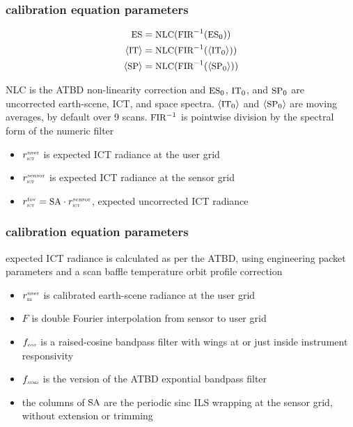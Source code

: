 \documentclass[11pt]{beamer}
\begin{document}
\begin{frame}
\frametitle{calibration equation parameters}

\vspace{-8mm}
\begin{align*}
  \mbox{\small ES} &= \mbox{\small NLC}(\mbox{\small FIR}^{-1}(\mbox{\small ES}_0)) \\
  \langle\mbox{\small IT}\rangle &= \mbox{\small NLC}(\mbox{\small FIR}^{-1}(\langle\mbox{\small IT}_0\rangle)) \\
  \langle\mbox{\small SP}\rangle &= \mbox{\small NLC}(\mbox{\small FIR}^{-1}(\langle\mbox{\small SP}_0\rangle)) \\
\end{align*}
\vspace{-8mm}

{\small NLC} is the ATBD non-linearity correction and $\mbox{\small ES}_0$,
$\mbox{\small IT}_0$, and $\mbox{\small SP}_0$ are uncorrected earth-scene, ICT, and space
spectra.  $\langle\mbox{\small IT}_0\rangle$ and $\langle\mbox{\small SP}_0\rangle$ are moving
averages, by default over 9 scans.  $\mbox{\small FIR}^{-1}$ is pointwise division
by the spectral form of the numeric filter

\begin{itemize}
  \item $r_{\mbox{\tiny\textsc{ict}}}^{\mbox{\tiny user}}$ is expected ICT radiance at the user grid
  \item $r_{\mbox{\tiny\textsc{ict}}}^{\mbox{\tiny sensor}}$ is expected ICT radiance at the sensor grid
  \item $r_{\mbox{\tiny\textsc{ict}}}^{\mbox{\tiny fov}} = \mbox{\small SA} \cdot r_{\mbox{\tiny\textsc{ict}}}^{\mbox{\tiny sensor}}$, expected uncorrected ICT
    radiance 
\end{itemize}

\end{frame}
\begin{frame}
\frametitle{calibration equation parameters}

expected ICT radiance is calculated as per the ATBD, using
engineering packet parameters and a scan baffle temperature orbit
profile correction

\begin{itemize}
  \item $r_{\mbox{\tiny\textsc{es}}}^{\mbox{\tiny user}}$ is calibrated earth-scene radiance at the user grid
  \item $F$ is double Fourier interpolation from sensor to user grid
  \item $f_{\mbox{\tiny cos}}$ is a raised-cosine bandpass filter with wings at or just
    inside instrument responsivity
  \item $f_{\mbox{\tiny\textsc{atbd}}}$ is the {\noaa} version of the {\cris} ATBD expontial
    bandpass filter
  \item the columns of $\mbox{\small SA}$ are the periodic sinc ILS wrapping at
    the sensor grid, without extension or trimming

\end{itemize}

\end{frame}
\end{document}
